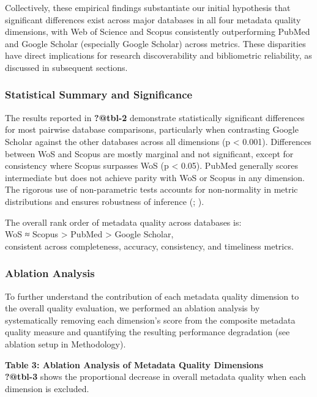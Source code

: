 \documentclass[
  12pt,
]{article}
\begin{document}
Collectively, these empirical findings substantiate our initial
hypothesis that significant differences exist across major databases in
all four metadata quality dimensions, with Web of Science and Scopus
consistently outperforming PubMed and Google Scholar (especially Google
Scholar) across metrics. These disparities have direct implications for
research discoverability and bibliometric reliability, as discussed in
subsequent sections.

\subsubsection{Statistical Summary and
Significance}\label{statistical-summary-and-significance}

The results reported in \textbf{?@tbl-2} demonstrate statistically
significant differences for most pairwise database comparisons,
particularly when contrasting Google Scholar against the other databases
across all dimensions (p \textless{} 0.001). Differences between WoS and
Scopus are mostly marginal and not significant, except for consistency
where Scopus surpasses WoS (p \textless{} 0.05). PubMed generally scores
intermediate but does not achieve parity with WoS or Scopus in any
dimension. The rigorous use of non-parametric tests accounts for
non-normality in metric distributions and ensures robustness of
inference (;
).

The overall rank order of metadata quality across databases is:\\
WoS ≈ Scopus \textgreater{} PubMed \textgreater{} Google Scholar,\\
consistent across completeness, accuracy, consistency, and timeliness
metrics.

\subsubsection{Ablation Analysis}\label{ablation-analysis}

To further understand the contribution of each metadata quality
dimension to the overall quality evaluation, we performed an ablation
analysis by systematically removing each dimension's score from the
composite metadata quality measure and quantifying the resulting
performance degradation (see ablation setup in Methodology).

\textbf{Table 3: Ablation Analysis of Metadata Quality Dimensions}\\
\textbf{?@tbl-3} shows the proportional decrease in overall metadata
quality when each dimension is excluded.
\end{document}
